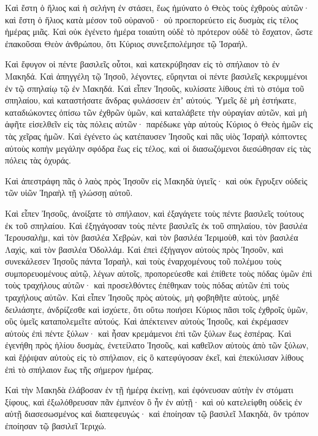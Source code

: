 {Καὶ ἔστη ὁ ἥλιος καὶ ἡ σελήνη ἐν στάσει, ἕως ἠμύνατο ὁ Θεὸς τοὺς ἐχθροὺς αὐτῶν· καὶ ἔστη ὁ ἥλιος κατὰ μέσον τοῦ οὐρανοῦ· οὐ προεπορεύετο εἰς δυσμὰς εἰς τέλος ἡμέρας μιᾶς.
Καὶ οὐκ ἐγένετο ἡμέρα τοιαύτη οὐδὲ τὸ πρότερον οὐδὲ τὸ ἔσχατον, ὥστε ἐπακοῦσαι Θεὸν ἀνθρώπου, ὅτι Κύριος συνεξεπολέμησε τῷ Ἰσραήλ.
\par }{\PP {}Καὶ ἔφυγον οἱ πέντε βασιλεῖς οὗτοι, καὶ κατεκρύβησαν εἰς τὸ σπήλαιον τὸ ἐν Μακηδά.
Καὶ ἀπηγγέλη τῷ Ἰησοῦ, λέγοντες, εὕρηνται οἱ πέντε βασιλεῖς κεκρυμμένοι ἐν τῷ σπηλαίῳ τῷ ἐν Μακηδά.
Καὶ εἶπεν Ἰησοῦς, κυλίσατε λίθους ἐπὶ τὸ στόμα τοῦ σπηλαίου, καὶ καταστήσατε ἄνδρας φυλάσσειν ἐπʼ αὐτούς.
Ὑμεῖς δὲ μὴ ἑστήκατε, καταδιώκοντες ὀπίσω τῶν ἐχθρῶν ὑμῶν, καὶ καταλάβετε τὴν οὐραγίαν αὐτῶν, καὶ μὴ ἀφῆτε εἰσελθεῖν εἰς τὰς πόλεις αὐτῶν· παρέδωκε γὰρ αὐτοὺς Κύριος ὁ Θεὸς ἡμῶν εἰς τὰς χεῖρας ἡμῶν.
Καὶ ἐγένετο ὡς κατέπαυσεν Ἰησοῦς καὶ πᾶς υἱὸς Ἰσραὴλ κόπτοντες αὐτοὺς κοπὴν μεγάλην σφόδρα ἕως εἰς τέλος, καὶ οἱ διασωζόμενοι διεσώθησαν εἰς τὰς πόλεις τὰς ὀχυράς.
\par }{\PP {}Καὶ ἀπεστράφη πᾶς ὁ λαὸς πρὸς Ἰησοῦν εἰς Μακηδὰ ὑγιεῖς· καὶ οὐκ ἔγρυξεν οὐδεὶς τῶν υἱῶν Ἰηραὴλ τῇ γλώσσῃ αὐτοῦ.
\par }{\PP {}Καὶ εἶπεν Ἰησοῦς, ἀνοίξατε τὸ σπήλαιον, καὶ ἐξαγάγετε τοὺς πέντε βασιλεῖς τούτους ἐκ τοῦ σπηλαίου.
Καὶ ἐξηγάγοσαν τοὺς πέντε βασιλεῖς ἐκ τοῦ σπηλαίου, τὸν βασιλέα Ἱερουσαλὴμ, καὶ τὸν βασιλέα Χεβρὼν, καὶ τὸν βασιλέα Ἱεριμοὺθ, καὶ τὸν βασιλέα Λαχὶς, καὶ τὸν βασιλέα Ὀδολλάμ.
Καὶ ἐπεὶ ἐξήγαγον αὐτοὺς πρὸς Ἰησοῦν, καὶ συνεκάλεσεν Ἰησοῦς πάντα Ἰσραὴλ, καὶ τοὺς ἐναρχομένους τοῦ πολέμου τοὺς συμπορευομένους αὐτῷ, λέγων αὐτοῖς, προπορεύεσθε καὶ ἐπίθετε τοὺς πόδας ὑμῶν ἐπὶ τοὺς τραχήλους αὐτῶν· καὶ προσελθόντες ἐπέθηκαν τοὺς πόδας αὐτῶν ἐπὶ τοὺς τραχήλους αὐτῶν.
Καὶ εἶπεν Ἰησοῦς πρὸς αὐτοὺς, μὴ φοβηθῆτε αὐτοὺς, μηδὲ δειλιάσητε, ἀνδρίζεσθε καὶ ἰσχύετε, ὅτι οὕτω ποιήσει Κύριος πᾶσι τοῖς ἐχθροῖς ὑμῶν, οὓς ὑμεῖς καταπολεμεῖτε αὐτούς.
Καὶ ἀπέκτεινεν αὐτοὺς Ἰησοῦς, καὶ ἐκρέμασεν αὐτοὺς ἐπὶ πέντε ξύλων· καὶ ἦσαν κρεμάμενοι ἐπὶ τῶν ξύλων ἕως ἑσπέρας.
Καὶ ἐγενήθη πρὸς ἡλίου δυσμὰς, ἐνετείλατο Ἰησοῦς, καὶ καθεῖλον αὐτοὺς ἀπὸ τῶν ξύλων, καὶ ἔῤῥιψαν αὐτοὺς εἰς τὸ σπήλαιον, εἰς ὃ κατεφύγοσαν ἐκεῖ, καὶ ἐπεκύλισαν λίθους ἐπὶ τὸ σπήλαιον ἕως τῆς σήμερον ἡμέρας.
\par }{\PP {}Καὶ τὴν Μακηδὰ ἐλάβοσαν ἐν τῇ ἡμέρᾳ ἐκείνῃ, καὶ ἐφόνευσαν αὐτὴν ἐν στόματι ξίφους, καὶ ἐξωλόθρευσαν πᾶν ἐμπνέον ὃ ἦν ἐν αὐτῇ· καὶ οὐ κατελείφθη οὐδεὶς ἐν αὐτῇ διασεσωσμένος καὶ διαπεφευγώς· καὶ ἐποίησαν τῷ βασιλεῖ Μακηδὰ, ὃν τρόπον ἐποίησαν τῷ βασιλεῖ Ἱεριχώ.
}
